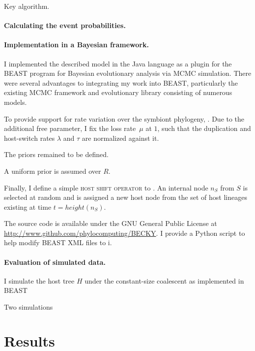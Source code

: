 \documentclass[12pt,letterpaper]{article}
\begin{document}
\begin{algorithm}
\caption{Key algorithm.}
\end{algorithm}



\paragraph*{Calculating the event probabilities.} 


\paragraph*{Implementation in a Bayesian framework.}

I implemented the described model in the Java language as a plugin for the BEAST program \parencite{Drummond:2012} for Bayesian evolutionary analysis via \ac{MCMC} simulation. There were several advantages to integrating my work into BEAST, particularly the existing \ac{MCMC} framework and evolutionary library consisting of numerous models.

To provide support for rate variation over the symbiont phylogeny, . Due to the additional free parameter, I fix the loss rate~$\mu$ at $1$, such that the duplication and host-switch rates $\lambda$ and $\tau$ are normalized against it.

The priors remained to be defined.

A uniform prior is assumed over $R$.

Finally, I define a simple \textsc{host shift operator} to . An internal node $n_S$ from $S$ is selected at random and is assigned a new host node from the set of host lineages existing at time $t = height(n_S)$.\

The source code is available under the GNU General Public License at \url{http://www.github.com/phylocomputing/BECKY}. I provide a Python script to help modify BEAST XML files to i.

\paragraph*{Evaluation of simulated data.}

I simulate the host tree $H$ under the constant-size coalescent \parencite{Kingman:1982} as implemented in BEAST \parencite{Drummmond:2012}

Two simulations

\section*{Results}
\end{document}
